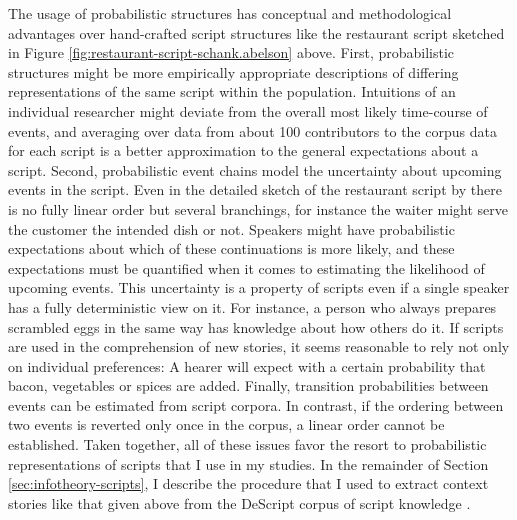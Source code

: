 The usage of probabilistic structures has conceptual and methodological advantages over hand-crafted script structures like the restaurant script sketched in Figure \ref{fig:restaurant-script-schank.abelson} above. First, probabilistic structures might be more empirically appropriate descriptions of  differing representations of the same script within the population. Intuitions of an individual researcher might deviate from the overall most likely time-course of events, and averaging over data from about 100 contributors to the corpus data for each script is a better approximation to the general expectations about a script. Second, probabilistic event chains model the uncertainty about upcoming events in the script. Even in the detailed sketch of the restaurant script by \citet{schank.abelson1977} there is no fully linear order but several branchings, for instance the waiter might serve the customer the intended dish or not. Speakers might have probabilistic expectations about which of these continuations is more likely, and these expectations must be quantified when it comes to estimating the likelihood of upcoming events. This uncertainty is a property of scripts even if a single speaker has a fully deterministic view on it. For instance, a person who always prepares scrambled eggs in the same way has knowledge about how others do it. If scripts are used in the comprehension of new stories, it seems reasonable to rely not only on individual preferences: A hearer will expect with a certain probability that bacon, vegetables or spices are added. 
Finally, transition probabilities between events can be estimated from script corpora. In contrast, if the ordering between two events is reverted only once in the corpus, a linear order cannot be established. Taken together, all of these issues favor the resort to probabilistic representations of scripts that I use in my studies. In the remainder of Section \ref{sec:infotheory-scripts}, I describe the procedure that I used to extract context stories like that given above from the DeScript corpus of script knowledge \citep{wanzare.etal2016}.

